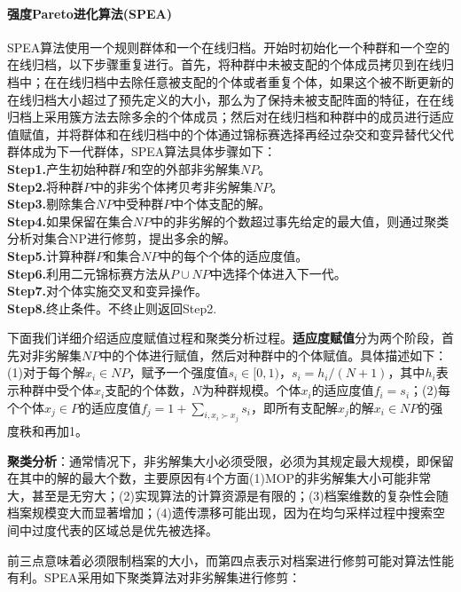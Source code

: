             \paragraph{强度Pareto进化算法(SPEA)}SPEA算法使用一个规则群体和一个在线归档。开始时初始化一个种群和一个空的在线归档，以下步骤重复进行。首先，将种群中未被支配的个体成员拷贝到在线归档中；在在线归档中去除任意被支配的个体或者重复个体，如果这个被不断更新的在线归档大小超过了预先定义的大小，那么为了保持未被支配阵面的特征，在在线归档上采用簇方法去除多余的个体成员；然后对在线归档和种群中的成员进行适应值赋值，并将群体和在线归档中的个体通过锦标赛选择再经过杂交和变异替代父代群体成为下一代群体，SPEA算法具体步骤如下：\\
            \textbf{Step1.}产生初始种群$P$和空的外部非劣解集$NP$。\\
            \textbf{Step2.}将种群$P$中的非劣个体拷贝考非劣解集$NP$。\\
            \textbf{Step3.}剔除集合$NP$中受种群$P$中个体支配的解。\\
            \textbf{Step4.}如果保留在集合$NP$中的非劣解的个数超过事先给定的最大值，则通过聚类分析对集合NP进行修剪，提出多余的解。\\
            \textbf{Step5.}计算种群$P$和集合$NP$中的每个个体的适应度值。\\
            \textbf{Step6.}利用二元锦标赛方法从$P\cup NP$中选择个体进入下一代。\\
            \textbf{Step7.}对个体实施交叉和变异操作。\\
            \textbf{Step8.}终止条件。不终止则返回Step2.
            \par
            下面我们详细介绍适应度赋值过程和聚类分析过程。\textbf{适应度赋值}分为两个阶段，首先对非劣解集$NP$中的个体进行赋值，然后对种群中的个体赋值。具体描述如下：(1)对于每个解$x_i\in NP$，赋予一个强度值$s_i\in [0,1)$，$s_i = h_i/(N+1)$，其中$h_i$表示种群中受个体$x_i$支配的个体数，$N$为种群规模。个体$x_i$的适应度值$f_i = s_i$；(2)每个个体$x_j\in P$的适应度值$f_j = 1+\sum\limits_{i,x_i \succ x_j}s_i$，即所有支配解$x_j$的解$x_i\in NP$的强度秩和再加1。
            \par
            \textbf{聚类分析}：通常情况下，非劣解集大小必须受限，必须为其规定最大规模，即保留在其中的解的最大个数，主要原因有4个方面(1)MOP的非劣解集大小可能非常大，甚至是无穷大；(2)实现算法的计算资源是有限的；(3)档案维数的复杂性会随档案规模变大而显著增加；(4)遗传漂移可能出现，因为在均匀采样过程中搜索空间中过度代表的区域总是优先被选择。
            \par
            前三点意味着必须限制档案的大小，而第四点表示对档案进行修剪可能对算法性能有利。SPEA采用如下聚类算法对非劣解集进行修剪：\\
